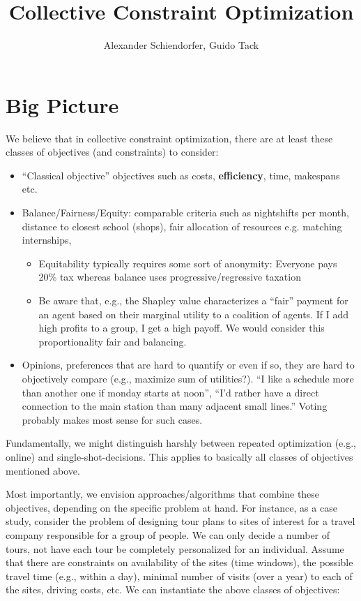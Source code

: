 \documentclass[10pt,a4paper,fleqn]{article}
\title{Collective Constraint Optimization}
\author{Alexander Schiendorfer, Guido Tack}
\begin{document}
\maketitle
\section{Big Picture}
We believe that in collective constraint optimization, there are at least these classes of objectives (and constraints) to consider:
\begin{itemize}
\item ``Classical objective'' objectives such as costs, \textbf{efficiency}, time, makespans etc.
\item Balance/Fairness/Equity: comparable criteria such as nightshifts per month, distance to closest school (shops), fair allocation of resources e.g. matching internships, 
\begin{itemize}
\item Equitability typically requires some sort of anonymity: Everyone pays 20\% tax whereas balance uses progressive/regressive taxation
\item Be aware that, e.g., the Shapley value characterizes a ``fair'' payment for an agent based on their marginal utility to a coalition of agents. If I add high profits to a group, I get a high payoff. We would consider this proportionality fair and balancing.
\end{itemize} 
\item Opinions, preferences that are hard to quantify or even if so, they are hard to objectively compare (e.g., maximize sum of utilities?). ``I like a schedule more than another one if monday starts at noon'', ``I'd rather have a direct connection to the main station than many adjacent small lines.'' Voting probably makes most sense for such cases.
\end{itemize}
Fundamentally, we might distinguish harshly between repeated optimization (e.g., online) and single-shot-decisions. This applies to basically all classes of objectives mentioned above.

Most importantly, we envision approaches/algorithms that combine these objectives, depending on the specific problem at hand. For instance, as a case study, consider the problem of designing tour plans to sites of interest for a travel company responsible for a group of people. We can only decide a number of tours, not have each tour be completely personalized for an individual.  Assume that there are constraints on availability of the sites (time windows), the possible travel time (e.g., within a day), minimal number of visits (over a year) to each of the sites, driving costs, etc. We can instantiate the above classes of objectives:
  
\end{document}
